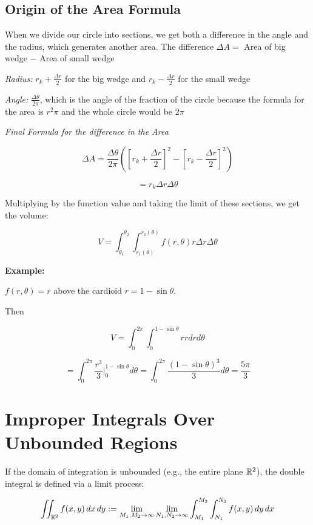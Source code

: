 \subsection{Origin of the Area Formula}

When we divide our circle into sections, we get both a difference in the angle and the radius, which 
generates another area. The difference \(\Delta A =\) Area of big wedge \(-\) Area of small wedge

\emph{Radius: }\(r_k + \frac{\Delta r}{2}\) for the big wedge and \(r_k - \frac{\Delta r}{2}\) for the 
small wedge

\emph{Angle: }\(\frac{\Delta \theta}{2 \pi}\), which is the angle of the fraction of the circle 
because the formula for the area is \(r^2 \pi\) and the whole circle would be \(2\pi\)

\emph{Final Formula for the difference in the Area}

\[
    \Delta A = \frac{\Delta \theta}{2 \pi} \left ( {\left[r_k + \frac{\Delta r}{2}\right]}^2 - 
    {\left[r_k - \frac{\Delta r}{2}\right]}^2\right)
\] 

\[ 
    = r_k \Delta r \Delta \theta
\]

Multiplying by the function value and taking the limit of these sections, we get the volume:

\[
    V = \int_{\theta_1}^{\theta_2} \int_{r_1 (\theta)}^{r_2 (\theta)} f(r, \theta) r \Delta r \Delta 
    \theta
\]

\textbf{Example:}

\(f(r, \theta) = r\) above the cardioid \(r = 1 - \sin \theta\).

Then

\[
    V = \int_{0}^{2\pi}\int_{0}^{1 - \sin \theta} r r dr d\theta
\]

\[
    = \int_{0}^{2\pi}\frac{r^3}{3} |_{0}^{1 - \sin \theta} d\theta = \int_{0}^{2\pi} 
    \frac{{(1 - \sin\theta)}^3}{3} d\theta = \frac{5 \pi}{3}
\]

\section{Improper Integrals Over Unbounded Regions}

If the domain of integration is unbounded (e.g., the entire plane \( \mathbb{R}^2 \)), the double integral is 
defined via a limit process:

\[
    \iint_{\mathbb{R}^2} f(x, y)\, dx\, dy := \lim_{M_1, M_2 \to \infty} \lim_{N_1, N_2 \to \infty}
    \int_{M_1}^{M_2} \int_{N_1}^{N_2} f(x, y)\, dy\, dx
\]

